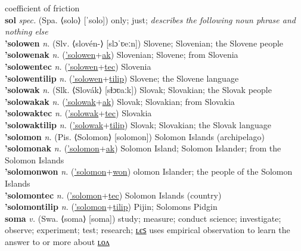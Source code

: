 coefficient of friction \label{sapupowinyolyan} \\
\textbf{sol} \textit{spec.} (Spa. ⟨solo⟩ [ˈsolo])
only; just; \textit{describes the following noun phrase and nothing else} \label{sol} \\
\textbf{'solowen} \textit{n.} (Slv. ⟨slovén-⟩ [slɔˈʋeːn])
Slovene; Slovenian; the Slovene people \label{'solowen} \\
\textbf{'solowenak} \textit{n.} (\hyperref['solowen]{'solowen}+\hyperref[ak]{ak})
Slovenian; Slovene; from Slovenia \label{'solowenak} \\
\textbf{'solowentec} \textit{n.} (\hyperref['solowen]{'solowen}+\hyperref[tec]{tec})
Slovenia \label{'solowentec} \\
\textbf{'solowentilip} \textit{n.} (\hyperref['solowen]{'solowen}+\hyperref[tilip]{tilip})
Slovene; the Slovene language \label{'solowentilip} \\
\textbf{'solowak} \textit{n.} (Slk. ⟨Slovák⟩ [sɫɔʋaːk])
Slovak; Slovakian; the Slovak people \label{'solowak} \\
\textbf{'solowakak} \textit{n.} (\hyperref['solowak]{'solowak}+\hyperref[ak]{ak})
Slovak; Slovakian; from Slovakia \label{'solowakak} \\
\textbf{'solowaktec} \textit{n.} (\hyperref['solowak]{'solowak}+\hyperref[tec]{tec})
Slovakia \label{'solowaktec} \\
\textbf{'solowaktilip} \textit{n.} (\hyperref['solowak]{'solowak}+\hyperref[tilip]{tilip})
Slovak; Slovakian; the Slovak language \label{'solowaktilip} \\
\textbf{'solomon} \textit{n.} (Pis. ⟨Solomon⟩ [solomon])
Solomon Islands (archipelago) \label{'solomon} \\
\textbf{'solomonak} \textit{n.} (\hyperref['solomon]{'solomon}+\hyperref[ak]{ak})
Solomon Island; Solomon Islander; from the Solomon Islands \label{'solomonak} \\
\textbf{'solomonwon} \textit{n.} (\hyperref['solomon]{'solomon}+\hyperref[won]{won})
olomon Islander; the people of the Solomon Islands \label{'solomonwon} \\
\textbf{'solomontec} \textit{n.} (\hyperref['solomon]{'solomon}+\hyperref[tec]{tec})
Solomon Islands (country) \label{'solomontec} \\
\textbf{'solomontilip} \textit{n.} (\hyperref['solomon]{'solomon}+\hyperref[tilip]{tilip})
Pijin; Solomons Pidgin \label{'solomontilip} \\
\textbf{soma} \textit{v.} (Swa. ⟨soma⟩ [soma])
study; measure; conduct science; investigate; observe; experiment; test; research; \hyperref[somales]{ʟєꜱ} uses empirical observation to learn the answer to or more about \hyperref[somalon]{ʟᴏᴧ} \label{soma} \\
